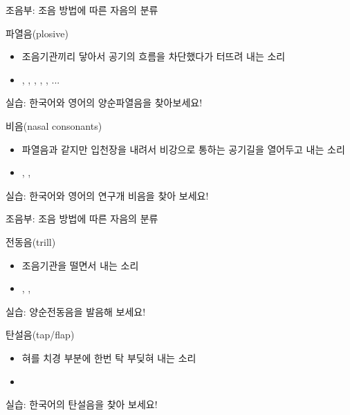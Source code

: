 \documentclass[11pt, aspectratio=169]{beamer}
\newcommand{\textds}[1]{{\ipafont #1}}
\begin{document}
\begin{frame}[t]{조음부: 조음 방법에 따른 자음의 분류}
    \begin{block}{파열음(plosive)}
        \begin{itemize}
            \item 조음기관끼리 닿아서 공기의 흐름을 차단했다가 터뜨려 내는 소리
            \item \textds{[p]}, \textds{[b]}, \textds{[t]}, \textds{[d]}, \textds{[k]}, \textds{[g]}... 
        \end{itemize}
    \end{block}
    실습: 한국어와 영어의 양순파열음을 찾아보세요!
    \begin{block}{비음(nasal consonants)}
        \begin{itemize}
            \item 파열음과 같지만 입천장을 내려서 비강으로 통하는 공기길을 열어두고 내는 소리
            \item \textds{[m]}, \textds{[n]}, \textds{[ŋ]}
        \end{itemize}
    \end{block}
    실습: 한국어와 영어의 연구개 비음을 찾아 보세요!
\end{frame}

\begin{frame}[t]{조음부: 조음 방법에 따른 자음의 분류}
    \begin{block}{전동음(trill)}
        \begin{itemize}
            \item 조음기관을 떨면서 내는 소리
            \item \textds{[ʙ]}, \textds{[r]}, \textds{[ʀ]}
        \end{itemize}
    \end{block}
    실습: 양순전동음을 발음해 보세요!
    \begin{block}{탄설음(tap/flap)}
        \begin{itemize}
            \item 혀를 치경 부분에 한번 탁 부딪혀 내는 소리
            \item \textds{[ɾ]}
        \end{itemize}
    \end{block}
    실습: 한국어의 탄설음을 찾아 보세요!
\end{frame}
\end{document}
